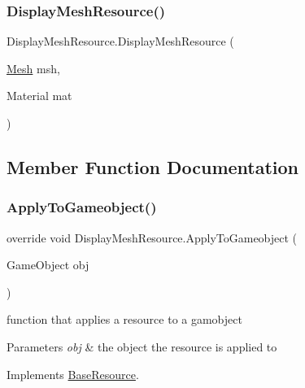 \subsubsection{\texorpdfstring{Display\+Mesh\+Resource()}{DisplayMeshResource()}\hspace{0.1cm}{\footnotesize\ttfamily [2/2]}}
{\footnotesize\ttfamily Display\+Mesh\+Resource.\+Display\+Mesh\+Resource (\begin{DoxyParamCaption}\item[{\mbox{\hyperlink{class_display_mesh_resource_a3ea74e82fc6354c0d84ed87b996e64d9}{Mesh}}}]{msh,  }\item[{Material}]{mat }\end{DoxyParamCaption})}



\subsection{Member Function Documentation}
\mbox{\label{class_display_mesh_resource_a62672f28a402bebeed1cb79fcca81828}} 
\subsubsection{\texorpdfstring{Apply\+To\+Gameobject()}{ApplyToGameobject()}}
{\footnotesize\ttfamily override void Display\+Mesh\+Resource.\+Apply\+To\+Gameobject (\begin{DoxyParamCaption}\item[{Game\+Object}]{obj }\end{DoxyParamCaption})\hspace{0.3cm}{\ttfamily [virtual]}}



function that applies a resource to a gamobject 


\begin{DoxyParams}{Parameters}
{\em obj} & the object the resource is applied to\\
\hline
\end{DoxyParams}


Implements \mbox{\hyperlink{class_base_resource_a2d832c8042114da9e3f6240651d59703}{Base\+Resource}}.



